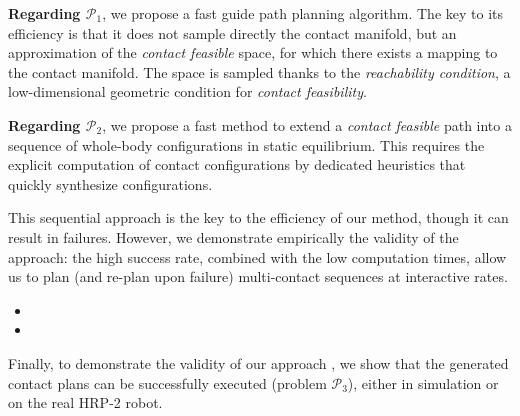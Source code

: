 \noindent \textbf{Regarding $\mathcal{P}_1$}, we propose a fast guide path planning algorithm. The key to its efficiency is that it does not sample
directly the contact manifold, but an approximation of the \textit{contact feasible} space, for which there exists a mapping to the contact manifold. 
The space is sampled thanks to the \textit{reachability condition}, a low-dimensional geometric condition for \textit{contact feasibility}.

\noindent \textbf{Regarding $\mathcal{P}_2$},  we propose a fast method to extend a \textit{contact feasible} path into a sequence of whole-body configurations in static equilibrium. This  requires the explicit computation of contact configurations by dedicated heuristics that quickly synthesize  configurations.

This sequential approach is the key to the efficiency of our method, though it
can result in failures. However, we demonstrate empirically the validity of the approach: the high success rate, combined with the low computation times, allow us to plan (and re-plan upon failure) multi-contact sequences at \gls{interactive} rates.

\begin{itemize}
\item {}
\item {}
\end{itemize}

Finally, to demonstrate the validity of our approach , we show that the generated contact plans  can be successfully executed (problem  $\mathcal{P}_3$), either in simulation or on the real HRP-2 robot.


